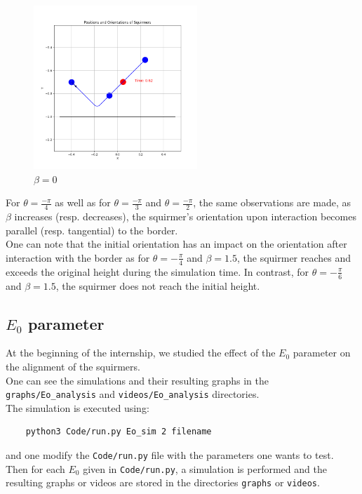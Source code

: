 \documentclass{article}
\begin{document}
\begin{figure}[H]
    \centering
    \includegraphics[width=0.55\textwidth]{graphs/simulations/border/beta0/mpi_4.png}
    \caption{\footnotesize $\beta = 0$}
\end{figure}
For $\theta = \frac{-\pi}{4}$ as well as for $\theta = \frac{-\pi}{3}$ and $\theta = \frac{-\pi}{2}$, 
the same observations are made, as $\beta$ increases (resp. decreases), the squirmer's 
orientation upon interaction becomes parallel (resp. tangential) to the border.\\
One can note that the initial orientation has an impact on the orientation after interaction with the border as for $\theta = -\frac{\pi}{4}$ and 
$\beta = 1.5$, the squirmer reaches and exceeds the original height during the simulation time. In contrast, for $\theta = -\frac{\pi}{6}$ and 
$\beta = 1.5$, the squirmer does not reach the initial height.

\subsection{$E_0$ parameter}
At the beginning of the internship, we studied the effect of the $E_0$ parameter on the alignment of the squirmers.\\
One can see the simulations and their resulting graphs in the \texttt{graphs/Eo\_analysis} and \texttt{videos/Eo\_analysis} directories.\\
The simulation is executed using:
\begin{verbatim}
    python3 Code/run.py Eo_sim 2 filename
\end{verbatim}
and one modify the \texttt{Code/run.py} file with the parameters one wants to test.
 Then for each $E_0$ given in \texttt{Code/run.py}, 
 a simulation is performed and the resulting graphs or videos are stored in the directories \texttt{graphs} or \texttt{videos}.\\
\end{document}
